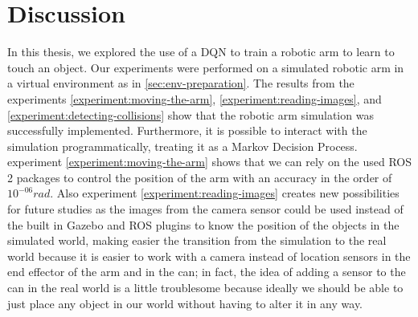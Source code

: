 \documentclass[12pt,oneside]{article}
\begin{document}
\section{Discussion}
In this thesis, we explored the use of a DQN to train a robotic arm to learn to touch an object. Our experiments were performed on a simulated robotic arm in a virtual environment as in \ref{sec:env-preparation}.
The results from the experiments \ref{experiment:moving-the-arm}, \ref{experiment:reading-images}, and \ref{experiment:detecting-collisions} show that the robotic arm simulation was successfully implemented. Furthermore, it is possible to interact with the simulation programmatically, treating it as a Markov Decision Process. experiment \ref{experiment:moving-the-arm} shows that we can rely on the used ROS 2 packages to control the position of the arm with an accuracy in the order of $10^{-06} rad$.
Also experiment \ref{experiment:reading-images} creates new possibilities for future studies as the images from the camera sensor could be used instead of the built in Gazebo and ROS plugins to know the position of the objects in the simulated world, making easier the transition from the simulation to the real world because it is easier to work with a camera instead of location sensors in the end effector of the arm and in the can; in fact, the idea of adding a sensor to the can in the real world is a little troublesome because ideally we should be able to just place any object in our world without having to alter it in any way. 
\end{document}
